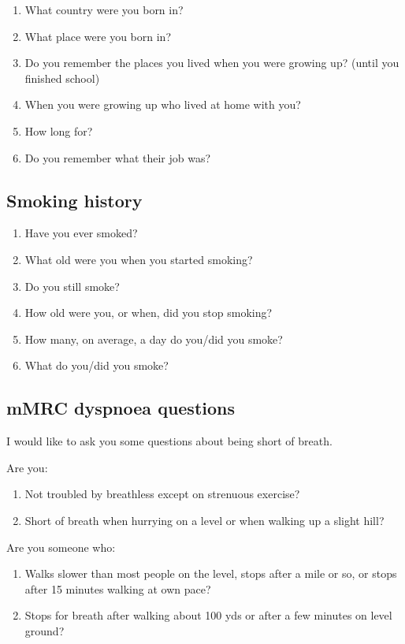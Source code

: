 \documentclass[a4paper,10pt]{article}
\begin{document}
\begin{enumerate}[resume]
\item What country were you born in? 
\item What place were you born in?
\item Do you remember the places you lived when you were growing up? (until you finished school) 
\item When you were growing up who lived at home with you?
\item How long for?
\item Do you remember what their job was?
\end{enumerate}

\subsection{Smoking history}

\begin{enumerate}
\item Have you ever smoked?
\item What old were you when you started smoking?
\item Do you still smoke?
\item How old were you, or when, did you stop smoking?
\item How many, on average, a day do you/did you smoke?
\item What do you/did you smoke?
\end{enumerate}

\subsection{mMRC dyspnoea questions} 

I would like to ask you some questions about being short of breath.

Are you:

\begin{enumerate}
\item Not troubled by breathless except on strenuous exercise?
\item Short of breath when hurrying on a level or when walking up a slight hill?
\end{enumerate}

Are you someone who:

\begin{enumerate}[resume]
\item Walks slower than most people on the level, stops after a mile or so, or stops after 15 minutes walking at own pace?
\item Stops for breath after walking about 100 yds or after a few minutes on level ground?
\end{enumerate}
\end{document}
